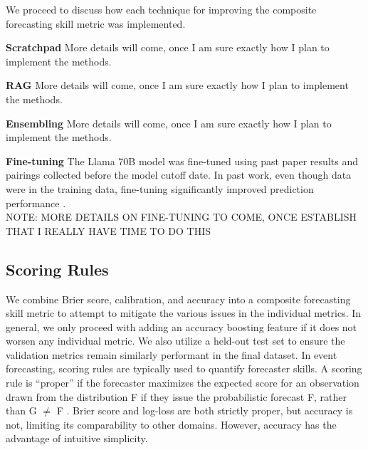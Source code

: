\documentclass[12pt,a4paper]{article}
\begin{document}
We proceed to discuss how each technique for improving the composite forecasting skill metric was implemented.

\textbf{Scratchpad}
More details will come, once I am sure exactly how I plan to implement the methods. %

\textbf{RAG}
More details will come, once I am sure exactly how I plan to implement the methods. %

\textbf{Ensembling}
More details will come, once I am sure exactly how I plan to implement the methods. %

\textbf{Fine-tuning}
The Llama 70B model was fine-tuned using past paper results and pairings collected before the model cutoff date. In past work, even though data were in the training data, fine-tuning significantly improved prediction performance . \\


NOTE: MORE DETAILS ON FINE-TUNING TO COME, ONCE ESTABLISH THAT I REALLY HAVE TIME TO DO THIS %

\textbf{}

\subsection{Scoring Rules} \label{sub:scoringrules}

We combine Brier score, calibration, and accuracy into a composite forecasting skill metric to attempt to mitigate the various issues in the individual metrics. In general, we only proceed with adding an accuracy boosting feature if it does not worsen any individual metric. We also utilize a held-out test set to ensure the validation metrics remain similarly performant in the final dataset. In event forecasting, scoring rules are typically used to quantify forecaster skills. A scoring rule is ``proper'' if the forecaster maximizes the expected score for an observation drawn from the distribution F if they issue the probabilistic forecast F, rather than G $\neq$ F . Brier score and log-loss are both strictly proper, but accuracy is not, limiting its comparability to other domains. However, accuracy has the advantage of intuitive simplicity.
\end{document}
